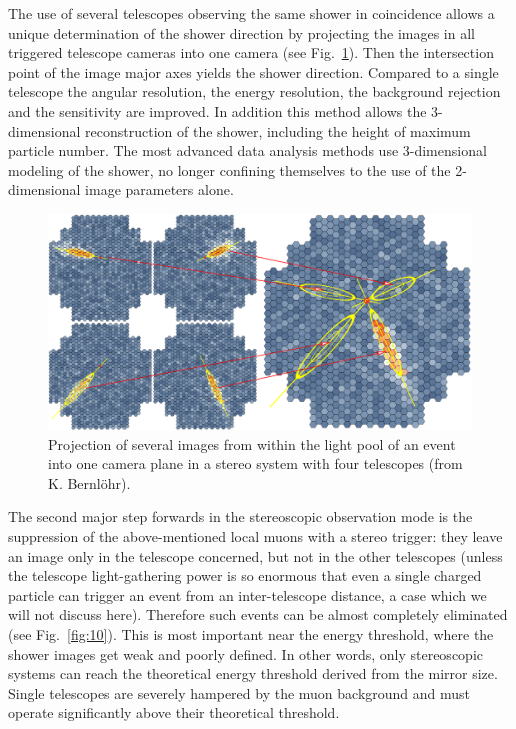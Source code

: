 \documentclass{svjour3x}                     %
\newcommand{\byKB}{ (from K. Bernl\"ohr)}
\begin{document}
The use of several telescopes observing the same shower in coincidence allows a
unique determination of the shower direction by projecting the images in all
triggered telescope cameras into one camera (see Fig.~\ref{fig:9}). Then the
intersection point of the image major axes yields the shower
direction. Compared to a single telescope the angular resolution, the energy
resolution, the background rejection and the sensitivity are improved. In
addition this method allows the 3-dimensional reconstruction of the shower,
including the height of maximum particle number. The most advanced data
analysis methods use 3-dimensional modeling of the shower, no longer
confining themselves to the use of the 2-dimensional image parameters alone.

\begin{figure}
  \includegraphics[width=\textwidth]{StereoImaging.eps}
  \caption[Stereo imaging]{Projection of several images from within the light pool of an event
   into one camera plane in a stereo system with four telescopes\byKB.}
  \label{fig:9}       %
\end{figure}
%

The second major step forwards in the stereoscopic observation mode is the
suppression of the above-mentioned local muons with a stereo trigger: they
leave an image only in the telescope concerned, but not in the other telescopes
(unless the telescope light-gathering power is so enormous that even a single
charged particle can trigger an event from an inter-telescope distance, a case
which we will not discuss here). Therefore such events can be almost completely
eliminated (see Fig.~\ref{fig:10}). This is most important near the
energy threshold, where the shower images get weak and poorly defined. In other
words, only stereoscopic systems can reach the theoretical energy threshold
derived from the mirror size. Single telescopes are severely hampered by the
muon background and must operate significantly above their theoretical
threshold.
\end{document}

